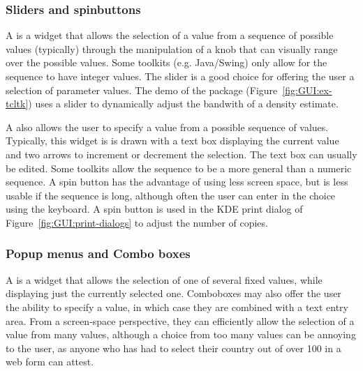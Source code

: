 \subsubsection{Sliders and spinbuttons}
\label{sec:GUI:sliders}

A  is a widget that allows the selection of a value from a
sequence of possible values (typically) through the manipulation of a
knob that can visually range over the possible values. Some toolkits
(e.g. Java/Swing) only allow for the sequence to have integer values. The
slider is a good choice for offering the user a selection of parameter
values. The  demo of the  package
(Figure~\ref{fig:GUI:ex-tcltk}) uses a slider to dynamically adjust the
bandwith of a density estimate.


A  also allows the user to specify a value from a
possible sequence of values. Typically, this widget is is drawn with a
text box displaying the current value and two arrows to increment or
decrement the selection. The text box can usually be edited. Some
toolkits allow the sequence to be a more general than a numeric
sequence. A spin button has the advantage of using less screen space,
but is less usable if the sequence is long, although often the user
can enter in the choice using the keyboard. A spin button is used in
the KDE print dialog of Figure~\ref{fig:GUI:print-dialogs} to adjust
the number of copies.


\subsubsection{Popup menus and Combo boxes}
\label{sec:GUI:combo-boxes}

A  is a widget that allows the selection of one of
several fixed values, while displaying just the currently selected
one. Comboboxes may also offer the user the ability to specify a
value, in which case they are combined with a text entry area. 
From a screen-space perspective, they can
efficiently allow the selection of a value from many values, although
a choice from too many values can be annoying to the user, as anyone
who has had to select their country out of over 100 in a web form can
attest.



